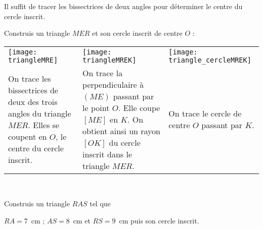  \vspace{2em}
 
 \begin{methode*1}
 
 \begin{remarque}
Il suffit de tracer les bissectrices de deux angles pour déterminer le centre du cercle inscrit.
 \end{remarque}
 
 \begin{exemple*1}
 Construis un triangle $MER$ et son cercle inscrit de centre $O$ :
 \begin{tabularx}{\textwidth}{X|X|X}
 \texttt{[image: triangleMRE]} &  \texttt{[image: triangleMREK]} & \texttt{[image: triangle\_cercleMREK]} \\ 
 On trace les bissectrices de deux des trois angles du triangle $MER$. Elles se coupent en $O$, le centre du cercle inscrit. & On trace la perpendiculaire à $(ME)$ passant par le point $O$. Elle coupe $[ME]$ en $K$. On obtient ainsi un rayon $[OK]$ du cercle inscrit dans le triangle $MER$. & On trace le cercle de centre $O$ passant par $K$. \\
 \end{tabularx} \\

\end{exemple*1}
 
 \exercice
Construis un triangle $RAS$ tel que 

$RA = 7$ cm ; $AS = 8$ cm et $RS = 9$ cm puis son cercle inscrit.
 
 \end{methode*1}

